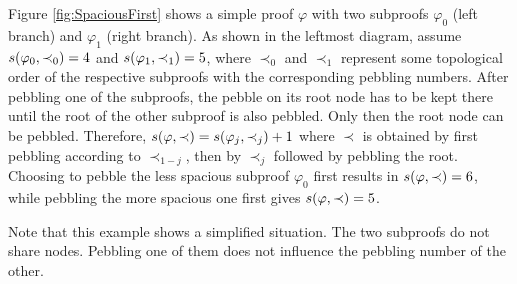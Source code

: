 \begin{example}
Figure \ref{fig:SpaciousFirst} shows a simple proof $\varphi$ with two subproofs $\varphi_0$ (left branch) and $\varphi_1$ (right branch). 
As shown in the leftmost diagram, assume $s(\varphi_0,\prec_0) = 4$ and $s(\varphi_1,\prec_1) = 5$, where $\prec_0$ and $\prec_1$ represent some topological order of the respective subproofs with the corresponding pebbling numbers.
After pebbling one of the subproofs, the pebble on its root node has to be kept there until the root of the other subproof is also pebbled. 
Only then the root node can be pebbled. 
Therefore, $s(\varphi,\prec) = s(\varphi_j,\prec_j) + 1$ where $\prec$ is obtained by first pebbling according to $\prec_{1-j}$, then by $\prec_{j}$ followed by pebbling the root.
Choosing to pebble the less spacious subproof $\varphi_0$ first results in $s(\varphi,\prec) = 6$, while pebbling the more spacious one first gives $s(\varphi,\prec) = 5$.

Note that this example shows a simplified situation. 
The two subproofs do not share nodes. 
Pebbling one of them does not influence the pebbling number of the other.


\end{example}
